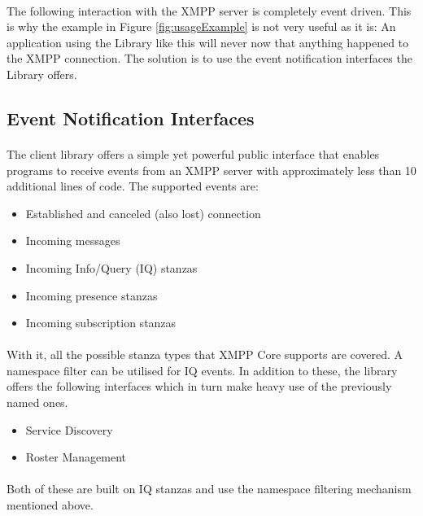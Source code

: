 \paragraph{}
The following interaction with the XMPP server is completely event driven. This is why the example in Figure \ref{fig:usageExample} is not very useful as it is: An application using the Library like this will never now that anything happened to the XMPP connection. The solution is to use the event notification interfaces the Library offers.

\subsection{Event Notification Interfaces}
\label{sec:interfaces}
\paragraph{}
The client library offers a simple yet powerful public interface that enables programs to receive events from an XMPP server with approximately less than 10 additional lines of code. The supported events are:
\begin{itemize}
\item Established and canceled (also lost) connection
\item Incoming messages
\item Incoming Info/Query (IQ) stanzas
\item Incoming presence stanzas
\item Incoming subscription stanzas
\end{itemize}
\paragraph{}
With it, all the possible stanza types that XMPP Core supports are covered. A namespace filter can be utilised for IQ events. In addition to these, the library offers the following interfaces which in turn make heavy use of the previously named ones.
\begin{itemize}
\item Service Discovery
\item Roster Management
\end{itemize}
\paragraph{}
Both of these are built on IQ stanzas and use the namespace filtering mechanism mentioned above.


